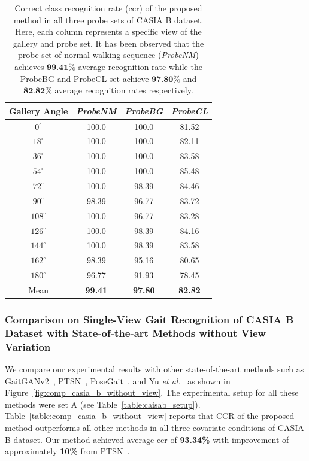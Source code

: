 \begin{table}[t]
	\centering
	\caption [Correct class recognition rate (CCR) of the proposed method in all three probe sets of CASIA B dataset]
	{Correct class recognition rate (\gls{ccr}) of the proposed method in all three probe sets of CASIA B dataset. Here, each column represents a specific view of the gallery and probe set. It has been observed that the probe set of normal walking sequence (\textit{ProbeNM}) achieves $ \textbf{99.41\%}$ average recognition rate while the ProbeBG and ProbeCL set achieve $ \textbf{97.80\%}$ and $\textbf{82.82\%}$ average recognition rates respectively. \label{table:resutl_without_view}}
	
	{\begin{tabular*}{22pc}{cccc}\hline
	Gallery Angle  &\textit{ProbeNM}  &\textit{ProbeBG} &\textit{ProbeCL} \\\hline\noalign{\smallskip} 
	${0^{\circ}}$	&100.0  &100.0  &81.52  \\\noalign{\smallskip}
	${18^{\circ}}$  &100.0  &100.0  &82.11  \\\noalign{\smallskip}
	${36^{\circ}}$	&100.0  &100.0  &83.58  \\\noalign{\smallskip}
	${54^{\circ}}$	&100.0  &100.0  &85.48  \\\noalign{\smallskip}
	${72^{\circ}}$	&100.0  &98.39 &84.46   \\\noalign{\smallskip}
	${90^{\circ}}$	&98.39  &96.77  &83.72  \\\noalign{\smallskip} 
	${108^{\circ}}$ &100.0  &96.77  &83.28  \\\noalign{\smallskip}
	${126^{\circ}}$ &100.0  &98.39  &84.16  \\\noalign{\smallskip}
	${144^{\circ}}$ &100.0  &98.39  &83.58  \\\noalign{\smallskip}
	${162^{\circ}}$	&98.39  &95.16  &80.65 \\\noalign{\smallskip}
	${180^{\circ}}$ &96.77  &91.93  &78.45  \\\noalign{\smallskip}
	Mean &\textbf{99.41}  &\textbf{97.80}  &\textbf{82.82} \\\hline
	\end{tabular*}}{}
\end{table}



\subsubsection{Comparison on Single-View Gait Recognition of CASIA B Dataset with State-of-the-art Methods without View Variation}
We compare our experimental results with other state-of-the-art methods such as GaitGANv2~\cite{Yu_19}, PTSN~\cite{Liao_17}, PoseGait~\cite{Liao_19}, and Yu \textit{et al.}~\cite{Yu_17_spae} as shown in Figure~\ref{fig:comp_casia_b_without_view}. The experimental setup for all these methods were set A (see Table~\ref{table:caisab_setup}). Table~\ref{table:comp_casia_b_without_view} reports that CCR of the proposed method outperforms all other methods in all three covariate conditions of CASIA B dataset. Our method achieved average \gls{ccr} of \textbf{93.34\%} with improvement of approximately \textbf{10\%} from PTSN~\cite{Liao_17}.


